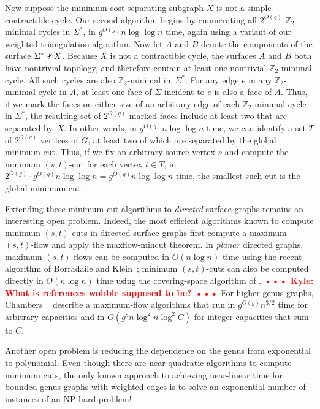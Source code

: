 \documentclass[natbib]{svcyclop}
\def\NOTE#1{\textcolor{Red}{\textbf{\textsf{••• #1 •••}}}}
\def\Z{\mathbb{Z}}
\def\snip{\mathbin{\raisebox{0.15ex}{\rotatebox[origin=c]{60}{\Rightscissors}\!}}}
\def\snip{\mathbin{\raisebox{0.15ex}{\rotatebox[origin=c]{60}{\Rightscissors}\!}}}
\begin{document}
Now suppose the minimum-cost separating subgraph $X$ is not a simple contractible cycle.  Our second algorithm begins by enumerating all $2^{O(g)}$ $\Z_2$-minimal cycles in $\Sigma^*$, in $g^{O(g)}n\log\log n$ time, again using a variant of our weighted-triangulation algorithm.  Now let $A$ and $B$ denote the components of the surface $\Sigma^*\snip X$.  Because $X$ is not a contractible cycle, the surfaces $A$ and $B$ both have nontrivial topology, and therefore contain at least one nontrivial $\Z_2$-minimal cycle.  All such cycles are also $\Z_2$-minimal in~$\Sigma^*$.  For any edge $e$ in any $\Z_2$-minimal cycle in $A$, at least one face of $\Sigma$ incident to $e$ is also a face of $A$.  Thus, if we mark the faces on either size of an arbitrary edge of each $\Z_2$-minimal cycle in $\Sigma^*$, the resulting set of $2^{O(g)}$ marked faces include at least two that are separated by~$X$.  In other words, in $g^{O(g)}n\log\log n$ time, we can identify a set $T$ of $2^{O(g)}$ vertices of $G$, at least two of which are separated by the global minimum cut.  Thus, if we fix an arbitrary source vertex $s$ and compute the minimum $(s,t)$-cut for each vertex $t\in T$, in $2^{O(g)}\cdot g^{O(g)}n\log\log n = g^{O(g)}n\log\log n$ time, the smallest such cut is the global minimum cut.




\OpenProb

Extending these minimum-cut algorithms to \emph{directed} surface graphs remains an interesting open problem.  Indeed, the most efficient algorithms known to compute minimum $(s,t)$-cuts in directed surface graphs first compute a maximum $(s,t)$-flow and apply the maxflow-mincut theorem.  In \emph{planar} directed graphs, maximum $(s,t)$-flows can be computed in $O(n\log n)$ time using the recent algorithm of Borradaile and Klein~\cite{bk-amfdp-09}; minimum $(s,t)$-cuts can also be computed directly in $O(n\log n)$ time using the covering-space algorithm of \cite{wobble}.
\NOTE{Kyle: What is references wobble supposed to be?}
For higher-genus graphs, Chambers \etal~\cite{cen-hfcc-12} describe a  maximum-flow algorithms that run in $g^{O(g)}n^{3/2}$ time for arbitrary capacities and in $O(g^8 n\log^2 n \log^2 C)$ for integer capacities that sum to $C$.

Another open problem is reducing the dependence on the genus from exponential to polynomial.  Even though there are near-quadratic algorithms to compute minimum cuts, the only known approach to achieving near-linear time for bounded-genus graphs with weighted edges is to solve an exponential number of instances of an NP-hard problem!
\end{document}
